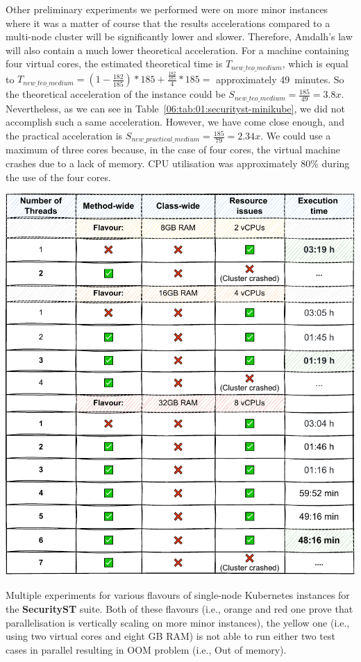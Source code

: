Other preliminary experiments we performed were on more minor instances where it was a matter of course that the results
accelerations compared to a multi-node cluster will be significantly lower and slower.
Therefore, Amdalh's law will also contain a much lower theoretical acceleration.
For a machine containing four virtual cores, the estimated theoretical time is $T_{new\_teo\_medium}$, which is equal to
$T_{new\_teo\_medium} = (1 - \frac{182}{185}) * 185 + \frac{\frac{182}{185}} {4} * 185 = $ approximately 49~minutes.
So the theoretical acceleration of the instance could be $S_{new\_teo\_medium} = \frac{185}{49} = 3.8x$.
Nevertheless, as we can see in Table~\ref{06:tab:01:securityst-minikube}, we did not accomplish such a same acceleration.
However, we have come close enough, and the practical acceleration is $S_{new\_practical\_medium} = \frac{185}{79} = 2.34x$.
We could use a maximum of three cores because, in the case of four cores, the virtual machine crashes due to a lack of memory.
CPU utilisation was approximately 80\% during the use of the four cores.
\begin{table}[ht!]
    \centering
    \includegraphics[scale=0.8]{obrazky-figures/08-experiments/preliminary/06-exp-preliminary-minikube-b}
    \caption{Multiple experiments for various flavours of single-node Kubernetes instances for the
    \textbf{SecurityST} suite. Both of these flavours (i.e., orange and red one prove that parallelisation is
    vertically scaling on more minor instances), the yellow one (i.e., using two virtual cores and eight GB RAM)
        is not able to run either two test cases in parallel resulting in OOM problem (i.e., Out of memory).}
    \label{06:tab:01:security-st-minikube}
\end{table}

